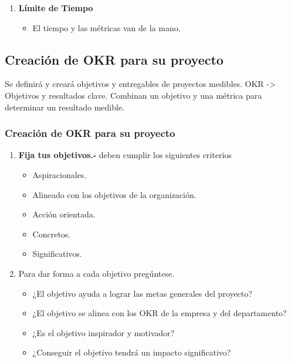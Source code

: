 \documentclass[10pt]{book}
\begin{document}
\begin{enumerate}[\bfseries 1.]
	\item \textbf{Límite de Tiempo} 
	    \begin{itemize}
		\item El tiempo y las métricas van de la mano.
	    \end{itemize}
    \end{enumerate}

    \subsection{Creación de OKR para su proyecto}
    Se definirá y creará objetivos y entregables de proyectos medibles. OKR -> Objetivos y resultados clave. Combinan un objetivo y una métrica para determinar un resultado medible. 
	\subsubsection{Creación de OKR para su proyecto}
	    \begin{enumerate}[\bfseries 1.]
		\item \textbf{Fija tus objetivos.-} deben cumplir los siguientes criterios
		    \begin{itemize}
			\item Aspiracionales.
			\item Alineado con los objetivos de la organización.
			\item Acción orientada.
			\item Concretos.
			\item Significativos.
		    \end{itemize}

		\item Para dar forma a cada objetivo pregúntese.
		\begin{itemize}
		    \item ¿El objetivo ayuda a lograr las metas generales del proyecto?
		    \item ¿El objetivo se alinea con los OKR de la empresa y del departamento?
		    \item ¿Es el objetivo inspirador y motivador?
		    \item ¿Conseguir el objetivo tendrá un impacto significativo?
		\end{itemize}
	    \end{enumerate}
\end{document}
